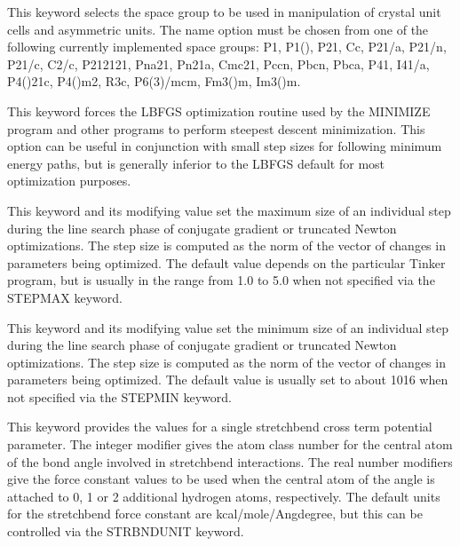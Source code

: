 \documentclass[letterpaper,11pt,english]{sphinxmanual}
\begin{document}

  This keyword selects the space group to be used in manipulation of crystal unit cells and asymmetric units. The name option must be chosen from one of the following currently implemented space groups: P1, P1(\sphinxhyphen{}), P21, Cc, P21/a, P21/n, P21/c, C2/c, P212121, Pna21, Pn21a, Cmc21, Pccn, Pbcn, Pbca, P41, I41/a, P4(\sphinxhyphen{})21c, P4(\sphinxhyphen{})m2, R3c, P6(3)/mcm, Fm3(\sphinxhyphen{})m, Im3(\sphinxhyphen{})m.



  This keyword forces the L\sphinxhyphen{}BFGS optimization routine used by the MINIMIZE program and other programs to perform steepest descent minimization. This option can be useful in conjunction with small step sizes for following minimum energy paths, but is generally inferior to the L\sphinxhyphen{}BFGS default for most optimization purposes.

  This keyword and its modifying value set the maximum size of an individual step during the line search phase of conjugate gradient or truncated Newton optimizations. The step size is computed as the norm of the vector of changes in parameters being optimized. The default value depends on the particular Tinker program, but is usually in the range from 1.0 to 5.0 when not specified via the STEPMAX keyword.

  This keyword and its modifying value set the minimum size of an individual step during the line search phase of conjugate gradient or truncated Newton optimizations. The step size is computed as the norm of the vector of changes in parameters being optimized. The default value is usually set to about 10\sphinxhyphen{}16 when not specified via the STEPMIN keyword.

  This keyword provides the values for a single stretch\sphinxhyphen{}bend cross term potential parameter. The integer modifier gives the atom class number for the central atom of the bond angle involved in stretch\sphinxhyphen{}bend interactions. The real number modifiers give the force constant values to be used when the central atom of the angle is attached to 0, 1 or 2 additional hydrogen atoms, respectively. The default units for the stretch\sphinxhyphen{}bend force constant are kcal/mole/Ang\sphinxhyphen{}degree, but this can be controlled via the STRBNDUNIT keyword.
\end{document}
